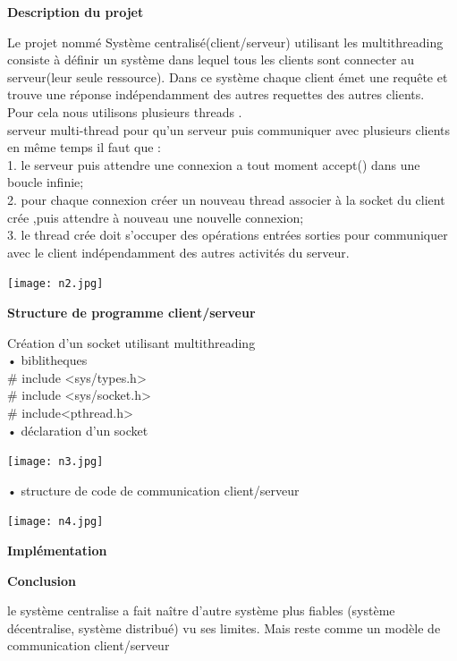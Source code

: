\documentclass[12pt, openany]{report}
\begin{document}
\newpage
\begin{center}
\textbf{Description du projet}
\end{center}

Le projet nommé Système centralisé(client/serveur) utilisant les multithreading consiste à définir un système dans lequel tous les clients sont connecter au serveur(leur seule ressource). Dans ce système chaque client émet une requête et trouve une réponse indépendamment des autres requettes des autres clients.\\
Pour cela nous utilisons plusieurs threads .\\
serveur multi-thread
pour qu’un serveur puis communiquer avec plusieurs clients en même temps il faut que :\\
    1. le serveur puis attendre une connexion a tout moment
accept()  dans une boucle infinie;\\

    2. pour chaque connexion créer un nouveau thread  associer à la socket du client crée ,puis attendre à nouveau une nouvelle connexion;\\

    3. le thread crée doit s’occuper des opérations entrées sorties pour communiquer avec le client indépendamment des autres activités du serveur.
    \begin{center}
\texttt{[image: n2.jpg]}~\\[1.5cm]
\end{center}
\newpage
\begin{center}
\textbf{Structure de programme client/serveur  }
\end{center}
Création d’un socket utilisant multithreading\\

    • biblitheques\\

\# include <sys/types.h>\\
\# include <sys/socket.h>\\
\# include<pthread.h>\\
    • déclaration d'un socket\\
    \begin{center}
\texttt{[image: n3.jpg]}~\\[1.5cm]
\end{center}
 
     • structure de code de communication client/serveur
    \begin{center}
\texttt{[image: n4.jpg]}~\\[1.5cm]
\end{center}
\newpage
\begin{center}
\textbf{Implémentation}
\end{center}
\newpage
\begin{center}
\textbf{Conclusion}
\end{center}
le système centralise a fait naître d’autre système plus fiables (système décentralise, système distribué) vu ses limites. Mais reste comme un modèle de communication client/serveur
\end{document}
